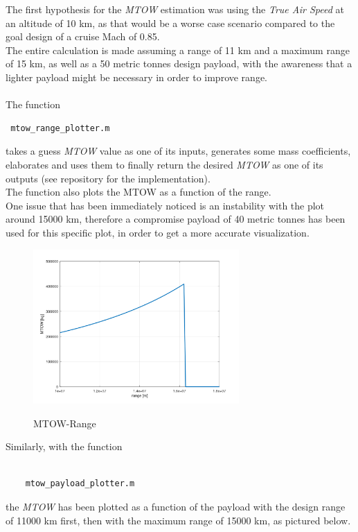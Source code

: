 \documentclass{article}
\begin{document}
The first hypothesis for the \textit{MTOW} estimation was using the \textit{True Air Speed}
at an altitude of 10 km, as that would be a worse case scenario compared to the goal design
of a cruise Mach of 0.85. \\ 
The entire calculation is made assuming a range of 11 km and a maximum range of 15 km, as well as
a 50 metric tonnes design payload, with the awareness that a lighter payload might be necessary
in order to improve range.\\ \\
The function \begin{verbatim} mtow_range_plotter.m \end{verbatim} takes a guess \textit{MTOW} value as one of its inputs, generates some mass coefficients,
elaborates and uses them to finally return the desired \textit{MTOW} as one of its outputs (see repository \autocite{Airbus_replacement_repo} for the implementation).\\ 
The function also plots the MTOW as a function of the range.\\
One issue that has been immediately noticed is an instability with the plot around 15000 km,
therefore a compromise payload of 40 metric tonnes has been used for this specific plot, in order to 
get a more accurate visualization. \\ 
\begin{figure}[h!]
    \centering
    \includegraphics[width=0.7\textwidth]{Sources/Plots_and_Pictures/MTOW_range.png}
    \label{MTOW_Range}
    \caption{MTOW-Range}
\end{figure}
\clearpage
Similarly, with the function \autocite{Airbus_replacement_repo}
\begin{verbatim}

    mtow_payload_plotter.m

\end{verbatim}
the \textit{MTOW} has been plotted as a function of the payload with the design
range of 11000 km first, then with the maximum range of 15000 km, as pictured below.
\end{document}

